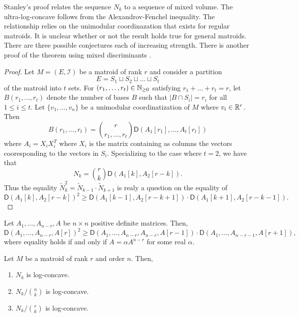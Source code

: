 \documentclass[12pt]{article}
\begin{document}
Stanley's proof relates the sequence $N_k$ to a sequence of mixed volume. The ultra-log-concave follows from the Alexandrov-Fenchel inequality. The relationship relies on the unimodular coordinazation that exists for regular matroids. It is unclear whether or not the result holds true for general matroids. There are three possible conjectures each of increasing strength. There is another proof of the theorem using mixed discriminants \cite{bapat_raghavan_1997}. 

\begin{proof}
	Let $M = (E, \mathcal{I})$ be a matroid of rank $r$ and consider a partition 
	\[
		E = S_1 \sqcup S_2 \sqcup \ldots \sqcup S_t
	\]
	of the matroid into $t$ sets. For $(r_1, \ldots, r_t) \in \mathbb{N}_{\geq 0}$ satisfying $r_1 + \ldots + r_t = r$, let $B(r_1, \ldots, r_t)$ denote the number of bases $B$ such that $|B \cap S_i| = r_i$ for all $1 \leq i \leq t$. Let $\{v_1, \ldots, v_n\}$ be a unimodular coordinatization of $M$ where $v_i \in \mathbb{R}^r$. Then 
	\[
		B(r_1, \ldots, r_t) = \binom{r}{r_1, \ldots, r_t} \mathsf{D} (A_1 [r_1], \ldots, A_t [r_t])
	\]
	where $A_i = X_i X_i^T$ where $X_i$ is the matrix containing as columns the vectors cooresponding to the vectors in $S_i$. Specializing to the case where $t = 2$, we have that 
	\[
		N_k = \binom{r}{k} \mathsf{D}(A_1[k], A_2[r-k]). 
	\]
	Thus the equality $\widetilde{N}_k^2 = \widetilde{N}_{k-1} \cdot \widetilde{N}_{k+1}$ is realy a question on the equality of 
	\[
		\mathsf{D}(A_1[k], A_2[r-k])^2 \geq \mathsf{D}(A_1[k-1], A_2[r-k+1]) \cdot \mathsf{D}(A_1[k+1], A_2[r-k-1]). 
	\]
\end{proof}
 
\begin{thm}
	Let $A_1, \ldots, A_{n-r}, A$ be $n \times n$ positive definite matrices. Then, 
	\[
		\mathsf{D}(A_1, \ldots, A_{n-r}, A[r])^2 \geq \mathsf{D} (A_1, \ldots, A_{n-r}, A_{n-r}, A[r-1]) \cdot \mathsf{D} (A_1, \ldots, A_{n-r-1}, A[r+1]), 
	\]
	where equality holds if and only if $A = \alpha A^{n-r}$ for some real $\alpha$. 
\end{thm}

\begin{conj} \label{main-conjecture}
	Let $M$ be a matroid of rank $r$ and order $n$. Then,  
	\begin{enumerate}[label = (\alph*)]
		\item $N_k$ is log-concave.
		\item $N_k /\binom{n}{k}$ is log-concave.
		\item $N_k / \binom{r}{k}$ is log-concave.
	\end{enumerate}
\end{conj}
\end{document}
